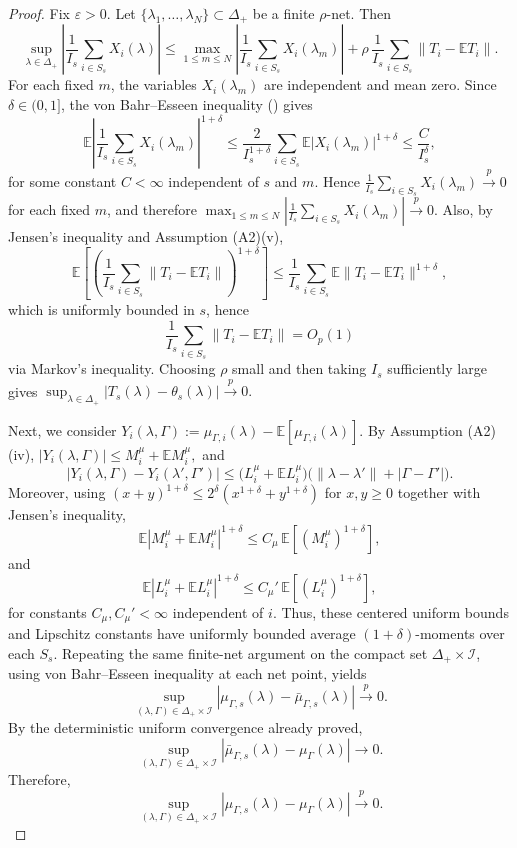 \documentclass[12pt,leqno,titlepage]{amsart}
\newcommand{\1}{\mathbbm{1}}
\begin{document}
\begin{bibunit}
{\begin{proof}
Fix \(\varepsilon>0\). Let \(\{\lambda_1,\dots,\lambda_N\}\subset\Delta_+\) be a finite \(\rho\)-net. Then
\[
\sup_{\lambda\in\Delta_+}\left|\frac1{I_s}\sum_{i\in S_s}X_i(\lambda)\right|
\le
\max_{1\le m\le N}\left|\frac1{I_s}\sum_{i\in S_s}X_i(\lambda_m)\right|
+
\rho\,\frac1{I_s}\sum_{i\in S_s}\|T_i-\mathbb ET_i\|.
\]
For each fixed \(m\), the variables \(X_i(\lambda_m)\) are independent and mean zero. Since \(\delta\in(0,1]\), the von Bahr--Esseen inequality (\citeyear{von1965inequalities}) gives
\[
\mathbb E\left|
\frac1{I_s}\sum_{i\in S_s}X_i(\lambda_m)
\right|^{1+\delta}
\le
\frac{2}{I_s^{1+\delta}}\sum_{i\in S_s}\mathbb E|X_i(\lambda_m)|^{1+\delta}
\le
\frac{C}{I_s^\delta},
\]
for some constant \(C<\infty\) independent of \(s\) and \(m\). Hence
$
\frac1{I_s}\sum_{i\in S_s}X_i(\lambda_m)\xrightarrow{p}0
$
for each fixed \(m\), and therefore
$
\max_{1\le m\le N}\left|\frac1{I_s}\sum_{i\in S_s}X_i(\lambda_m)\right|\xrightarrow{p}0.
$
Also, by Jensen's inequality and Assumption \textup{(A2)(v)},
\[
\mathbb E\left[\left(\frac1{I_s}\sum_{i\in S_s}\|T_i-\mathbb ET_i\|\right)^{1+\delta}\right]
\le
\frac1{I_s}\sum_{i\in S_s}\mathbb E\|T_i-\mathbb ET_i\|^{1+\delta},
\]
which is uniformly bounded in $s$, hence
\[
\frac1{I_s}\sum_{i\in S_s}\|T_i-\mathbb ET_i\|=O_p(1)
\]
via Markov's inequality. Choosing \(\rho\) small and then taking \(I_s\) sufficiently large gives
$
\sup_{\lambda\in\Delta_+}|T_s(\lambda)-\theta_s(\lambda)|\xrightarrow{p}0.
$

Next, we consider
$
Y_i(\lambda,\Gamma):=\mu_{\Gamma,i}(\lambda)-\mathbb E[\mu_{\Gamma,i}(\lambda)].
$
By Assumption \textup{(A2)(iv)},
$
|Y_i(\lambda,\Gamma)|\le M_i^\mu+\mathbb EM_i^\mu,
$
and
\[
|Y_i(\lambda,\Gamma)-Y_i(\lambda',\Gamma')|
\le
\bigl(L_i^\mu+\mathbb EL_i^\mu\bigr)\bigl(\|\lambda-\lambda'\|+|\Gamma-\Gamma'|\bigr).
\]
Moreover, using \((x+y)^{1+\delta}\le 2^\delta(x^{1+\delta}+y^{1+\delta})\) for \(x,y\ge 0\) together with Jensen's inequality,
\[
\mathbb E|M_i^\mu+\mathbb EM_i^\mu|^{1+\delta}\le C_\mu\,\mathbb E[(M_i^\mu)^{1+\delta}],
\]
and
\[
\mathbb E|L_i^\mu+\mathbb EL_i^\mu|^{1+\delta}\le C_\mu'\,\mathbb E[(L_i^\mu)^{1+\delta}],
\]
for constants \(C_\mu,C_\mu'<\infty\) independent of \(i\). Thus, these centered uniform bounds and Lipschitz constants have uniformly bounded average \((1+\delta)\)-moments over each \(S_s\). Repeating the same finite-net argument on the compact set \(\Delta_+\times\mathcal I\), using von Bahr--Esseen inequality at each net point, yields
\[
\sup_{(\lambda,\Gamma)\in\Delta_+\times\mathcal I}
\left|
\mu_{\Gamma,s}(\lambda)-\bar\mu_{\Gamma,s}(\lambda)
\right|
\xrightarrow{p}0.
\]
By the deterministic uniform convergence already proved,
\[
\sup_{(\lambda,\Gamma)\in\Delta_+\times\mathcal I}
\left|
\bar\mu_{\Gamma,s}(\lambda)-\mu_\Gamma(\lambda)
\right|
\to 0.
\]
Therefore,
\[
\sup_{(\lambda,\Gamma)\in\Delta_+\times\mathcal I}
|\mu_{\Gamma,s}(\lambda)-\mu_\Gamma(\lambda)|
\xrightarrow{p}0.
\]


\end{proof}}
\end{bibunit}
\end{document}
